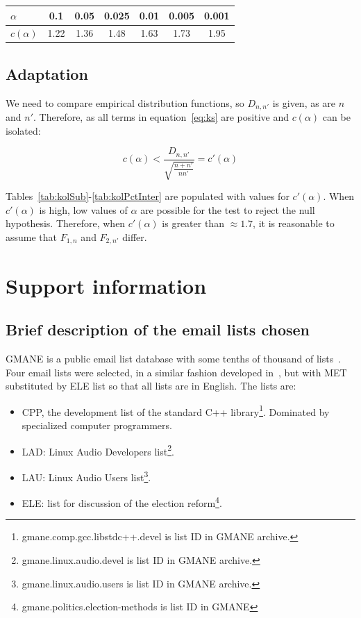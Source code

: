 \documentclass[%
 aip,
 jmp,%
 amsmath,amssymb,
 reprint,%
]{revtex4-1}
\begin{document}
\begin{table}[H]
\centering
\begin{tabular}{|l||c|c|c|c|c|c|}\hline
$\alpha$    & 0.1  & 0.05 & 0.025 & 0.01 & 0.005 & 0.001 \\\hline
$c(\alpha)$ & 1.22 & 1.36 & 1.48  & 1.63 & 1.73  & 1.95  \\\hline
\end{tabular}
\end{table}

\subsection{Adaptation}
We need to compare empirical distribution functions, so $D_{n,n'}$ is given, as are $n$ and $n'$. Therefore, as all terms in equation~\ref{eq:ks} are positive and $c(\alpha)$ can be isolated:

\begin{equation}\label{eq:ks2}
c(\alpha) < \frac{D_{n,n'}}{\sqrt{\frac{n+n'}{nn'}}} = c'(\alpha)
\end{equation}

Tables~\ref{tab:kolSub}-\ref{tab:kolPctInter} are populated with values for $c'(\alpha)$. When $c'(\alpha)$ is high, low values of $\alpha$ are possible for the test to reject the null hypothesis. Therefore, when $c'(\alpha)$ is greater than $\approx 1.7$, it is reasonable to assume that $F_{1,n}$ and $F_{2,n'}$ differ.

\section{Support information}\label{sec:si}
\subsection{Brief description of the email lists chosen}\label{subsec:gm}
GMANE is a public email list database with some tenths of thousand of lists~\cite{GMANE}. Four email lists were selected, in a similar fashion developed in~\cite{evoSN}, but with MET substituted by ELE list so that all lists are in English. The lists are:
\begin{itemize}
    \item CPP, the development list of the standard C++ library\footnote{gmane.comp.gcc.libstdc++.devel is list ID in GMANE archive.}. Dominated by specialized computer programmers.
    \item LAD: Linux Audio Developers list\footnote{gmane.linux.audio.devel is list ID in GMANE archive.}.
    \item LAU: Linux Audio Users list\footnote{gmane.linux.audio.users is list ID in GMANE archive.}.
    \item ELE: list for discussion of the election reform\footnote{gmane.politics.election-methods is list ID in GMANE}.
\end{itemize}
\end{document}

